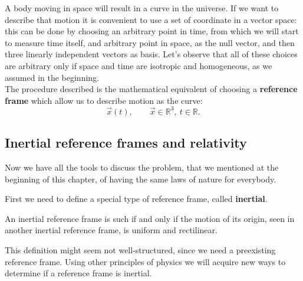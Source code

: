 A body moving in space will result in a curve in the universe. If we want to describe that motion it is convenient to use a set of coordinate in a vector space: this can be done by choosing an arbitrary point in time, from which we will start to measure time itself, and arbitrary point in space, as the null vector, and then three linearly independent vectors as basis. Let's observe that all of these choices are arbitrary only if space and time are isotropic and homogeneous, as we assumed in the beginning.\\ The procedure described is the mathematical equivalent of choosing a \textbf{reference frame} which allow us to describe motion as the curve:
\begin{equation*}
    \vec x(t),\qquad \vec x\in \mathbb{R}^3,\ t\in\mathbb{R}.
\end{equation*}
\subsection{Inertial reference frames and relativity}
Now we have all the tools to discuss the problem, that we mentioned at the beginning of this chapter, of having the same laws of nature for everybody.

First we need to define a special type of reference frame, called \textbf{inertial}. 
\begin{definition}
    An inertial reference frame is such if and only if the motion of its origin, seen in another inertial reference frame, is uniform and rectilinear.
\end{definition}
This definition might seem not well-structured, since we need a preexisting reference frame. Using other principles of physics we will acquire new ways to determine if a reference frame is inertial.

